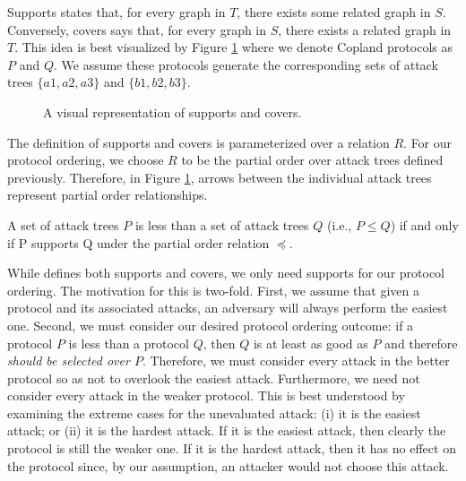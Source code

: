 \documentclass[runningheads]{llncs}
\theoremstyle{definition}
\begin{document}
Supports states that, for every graph in $T$, there exists some
related graph in $S$. Conversely, covers says that, for every graph in
$S$, there exists a related graph in $T$.  This idea is best
visualized by Figure \ref{fig:sup-cov} where we denote Copland
protocols as $P$ and $Q$. We assume these protocols generate the
corresponding sets of attack trees $\{a1, a2, a3 \}$ and
$ \{b1, b2 ,b3\}$.

\begin{figure}[htbp]
    \centering
    
    \captionsetup{justification=centering,margin=1cm}
    \caption[Supports and covers]{A visual representation of supports and covers.}
    \label{fig:sup-cov}
\end{figure}

The definition of supports and covers is parameterized over a relation
$R$. For our protocol ordering, we choose $R$ to be the partial order
over attack trees defined previously. Therefore, in Figure
\ref{fig:sup-cov}, arrows between the individual attack trees
represent partial order relationships. 

\begin{definition}
  A set of attack trees $P$ is less than a set of attack trees $Q$
  (i.e., $P \leq Q$) if and only if P supports Q under the partial
  order relation $\preceq$. 
\end{definition} 

While \citeauthor{Rowe:2021:OnOrdering} defines both supports and
covers, we only need supports for our protocol ordering. The
motivation for this is two-fold. First, we assume that given a protocol
and its associated attacks, an adversary will always perform the
easiest one.  Second, we must consider our desired protocol ordering
outcome: if a protocol $P$ is less than a protocol $Q$, then $Q$ is at
least as good as $P$ and therefore \emph{should be selected over
  $P$}. Therefore, we must consider every attack in the better
protocol so as not to overlook the easiest attack. Furthermore, we
need not consider every attack in the weaker protocol. This is best
understood by examining the extreme cases for the unevaluated attack:
(i) it is the easiest attack; or (ii) it is the hardest attack. If it
is the easiest attack, then clearly the protocol is still the weaker
one. If it is the hardest attack, then it has no effect on the
protocol since, by our assumption, an attacker would not choose this
attack.
\end{document}
